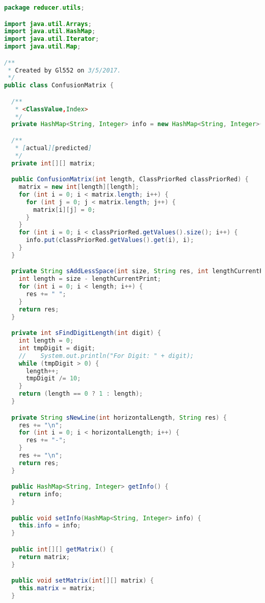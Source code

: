 \begin{lstlisting}[language=Java,basicstyle=\tiny,caption=ConfusionMatrix.java]
package reducer.utils;

import java.util.Arrays;
import java.util.HashMap;
import java.util.Iterator;
import java.util.Map;

/**
 * Created by Gl552 on 3/5/2017.
 */
public class ConfusionMatrix {

  /**
   * <ClassValue,Index>
   */
  private HashMap<String, Integer> info = new HashMap<String, Integer>();

  /**
   * [actual][predicted]
   */
  private int[][] matrix;

  public ConfusionMatrix(int length, ClassPriorRed classPriorRed) {
    matrix = new int[length][length];
    for (int i = 0; i < matrix.length; i++) {
      for (int j = 0; j < matrix.length; j++) {
        matrix[i][j] = 0;
      }
    }
    for (int i = 0; i < classPriorRed.getValues().size(); i++) {
      info.put(classPriorRed.getValues().get(i), i);
    }
  }

  private String sAddLessSpace(int size, String res, int lengthCurrentPrint) {
    int length = size - lengthCurrentPrint;
    for (int i = 0; i < length; i++) {
      res += " ";
    }
    return res;
  }

  private int sFindDigitLength(int digit) {
    int length = 0;
    int tmpDigit = digit;
    //    System.out.println("For Digit: " + digit);
    while (tmpDigit > 0) {
      length++;
      tmpDigit /= 10;
    }
    return (length == 0 ? 1 : length);
  }

  private String sNewLine(int horizontalLength, String res) {
    res += "\n";
    for (int i = 0; i < horizontalLength; i++) {
      res += "-";
    }
    res += "\n";
    return res;
  }

  public HashMap<String, Integer> getInfo() {
    return info;
  }

  public void setInfo(HashMap<String, Integer> info) {
    this.info = info;
  }

  public int[][] getMatrix() {
    return matrix;
  }

  public void setMatrix(int[][] matrix) {
    this.matrix = matrix;
  }


\end{lstlisting}
